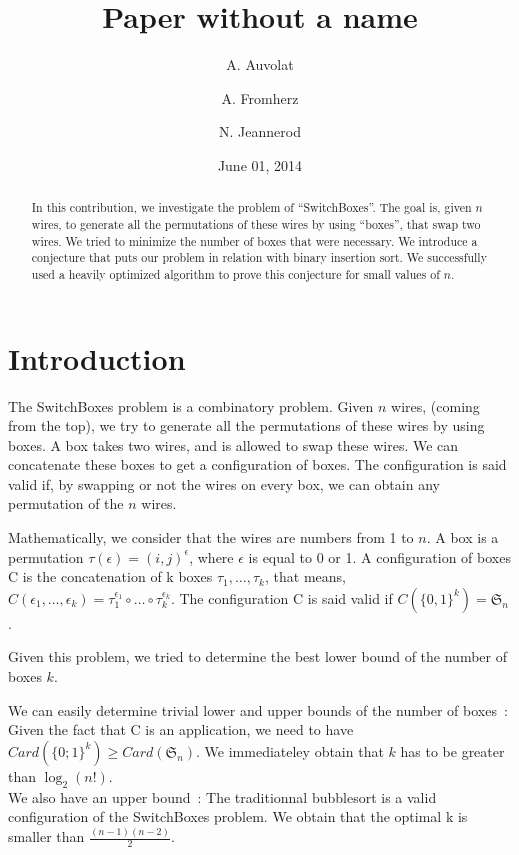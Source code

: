 \documentclass[11pt, a4paper]{article}
\begin{document}
\title{ Paper without a name }
\author{A. Auvolat \and A. Fromherz \and N. Jeannerod }
\date{June 01, 2014}
\maketitle

\begin{abstract}

In this contribution, we investigate the problem of ``SwitchBoxes''.  The goal is,
given $n$ wires, to generate all the permutations of these wires by using
``boxes'', that swap two wires. We tried to minimize the number of boxes that were
necessary.  We introduce a conjecture that puts our problem in relation with
binary insertion sort.  We successfully used a heavily optimized algorithm to
prove this conjecture for small values of $n$.

\end{abstract}

\section{Introduction}

The SwitchBoxes problem is a combinatory problem. Given $n$ wires, (coming from
the top), we try to generate all the permutations of these wires by using boxes.
A box takes two wires, and is allowed to swap these wires. We can concatenate
these boxes to get a configuration of boxes.  The configuration is said valid
if, by swapping or not the wires on every box, we can obtain any permutation of
	the $n$ wires.

Mathematically, we consider that the wires are numbers from 1 to $n$. A box is a
permutation $\tau(\epsilon) = (i,j)^{\epsilon}$, where $\epsilon$ is equal to 0
or 1.  A configuration of boxes C is the concatenation of k boxes $\tau_1,
\ldots, \tau_k$, that means, $C(\epsilon_1, \ldots, \epsilon_k) =
\tau_1^{\epsilon_1}\circ\ldots\circ\tau_k^{\epsilon_k}$.  The configuration C is
said valid if $C(\{0,1\}^k)= \mathfrak{S}_n$.

Given this problem, we tried to determine the best lower bound of the number of
boxes $k$.

We can easily determine trivial lower and upper bounds of the number of
boxes~:\\ Given the fact that C is an application, we need to have
$Card(\{0;1\}^{k}) \geq Card(\mathfrak{S}_n)$. We immediateley obtain that $k$
has to be greater than $\log_2(n!)$.\\ We also have an upper bound~: The
traditionnal bubblesort is a valid configuration of the SwitchBoxes problem. We
obtain that the optimal k is smaller than $\frac{(n-1)(n-2)}{2}$.
\end{document}
